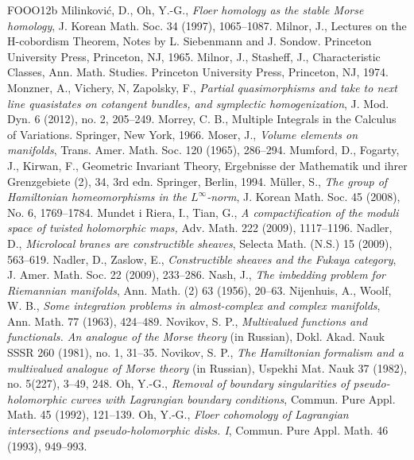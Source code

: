 \begin{thebibliography}{FOOO12b}
 Milinković, D., Oh, Y.-G., \textit{Floer homology as the stable Morse homology}, J. Korean Math. Soc. 34 (1997), 1065--1087.
 Milnor, J., Lectures on the H-cobordism Theorem, Notes by L. Siebenmann and J. Sondow. Princeton University Press, Princeton, NJ, 1965.
 Milnor, J., Stasheff, J., Characteristic Classes, Ann. Math. Studies. Princeton University Press, Princeton, NJ, 1974.
 Monzner, A., Vichery, N, Zapolsky, F., \textit{Partial quasimorphisms and take to next line quasistates on cotangent bundles, and symplectic homogenization}, J. Mod. Dyn. 6 (2012), no. 2, 205--249.
 Morrey, C. B., Multiple Integrals in the Calculus of Variations. Springer, New York, 1966.
 Moser, J., \textit{Volume elements on manifolds}, Trans. Amer. Math. Soc. 120 (1965), 286--294.
 Mumford, D., Fogarty, J., Kirwan, F., Geometric Invariant Theory, Ergebnisse der Mathematik und ihrer Grenzgebiete (2), 34, 3rd edn. Springer, Berlin, 1994.
 Müller, S., \textit{The group of Hamiltonian homeomorphisms in the $L^\infty$-norm}, J. Korean Math. Soc. 45 (2008), No. 6, 1769--1784.
 Mundet i Riera, I., Tian, G., \textit{A compactification of the moduli space of twisted holomorphic maps,} Adv. Math. 222 (2009), 1117--1196.
 Nadler, D., \textit{Microlocal branes are constructible sheaves}, Selecta Math. (N.S.) 15 (2009), 563--619.
 Nadler, D., Zaslow, E., \textit{Constructible sheaves and the Fukaya category}, J. Amer. Math. Soc. 22 (2009), 233--286.
 Nash, J., \textit{The imbedding problem for Riemannian manifolds}, Ann. Math. (2) 63 (1956), 20--63.
 Nijenhuis, A., Woolf, W. B., \textit{Some integration problems in almost-complex and complex manifolds}, Ann. Math. 77 (1963), 424--489.
 Novikov, S. P., \textit{Multivalued functions and functionals. An analogue of the Morse theory} (in Russian), Dokl. Akad. Nauk SSSR 260 (1981), no. 1, 31--35.
 Novikov, S. P., \textit{The Hamiltonian formalism and a multivalued analogue of Morse theory} (in Russian), Uspekhi Mat. Nauk 37 (1982), no. 5(227), 3--49, 248.
 Oh, Y.-G., \textit{Removal of boundary singularities of pseudo-holomorphic curves with Lagrangian boundary conditions}, Commun. Pure Appl. Math. 45 (1992), 121--139.
 Oh, Y.-G., \textit{Floer cohomology of Lagrangian intersections and pseudo-holomorphic disks. I}, Commun. Pure Appl. Math. 46 (1993), 949--993.

\end{thebibliography}
